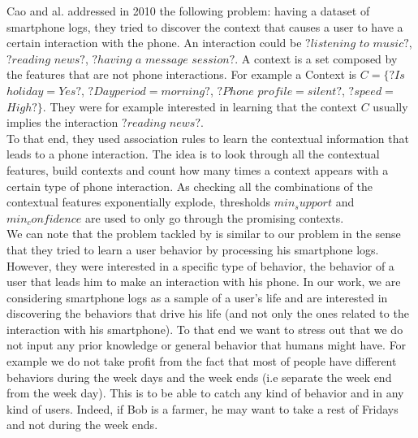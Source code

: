 Cao and al. \cite{interaction} addressed in 2010 the following problem: having a dataset of smartphone logs, they tried to discover the context that causes a user to have a certain interaction with the phone. An interaction could be $?listening$ $to$ $music?$, $?reading$ $news?$, $?having$ $a$ $message$ $session?$. A context is a set composed by the features that are not phone interactions. For example a Context is $C= \{$$?Is$ $holiday$$=$$Yes?$, $?Day period$$=$$morning?$, $?Phone$ $profile$$=$$silent?$, $?speed$$=$$High?\}$. They were for example interested in learning that the context $C$ usually implies the interaction $?reading$ $news?$.
\\To that end, they used association rules to learn the contextual information that leads to a phone interaction. The idea is to look through all the contextual features, build contexts and count how many times a context appears with a certain type of phone interaction. As checking all the combinations of the contextual features exponentially explode, thresholds $min_support$ and $min_confidence$ are used to only go through the promising contexts.
\\We can note that the problem tackled by \cite{interaction} is similar to our problem in the sense that they tried to learn a user behavior by processing his smartphone logs. However, they were interested in a specific type of behavior, the behavior of a user that leads him to make an interaction with his phone. In our work, we are considering smartphone logs as a sample of a user's life and are interested in discovering the behaviors that drive his life (and not only the ones related to the interaction with his smartphone). To that end we want to stress out that we do not input any prior knowledge or general behavior that humans might have. For example we do not take profit from the fact that most of people have different behaviors during the week days and the week ends (i.e separate the week end from the week day). This is to be able to catch any kind of behavior and in any kind of users. Indeed, if Bob is a farmer, he may want to take a rest of Fridays and not during the week ends.\par

